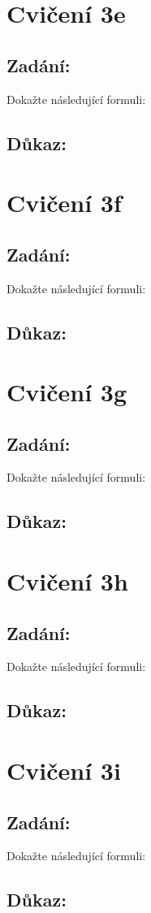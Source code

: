 \documentclass{article}
\begin{document}
\section{Cvičení 3e}

\subsection{Zadání:}

Dokažte následující formuli:
$$$$

\subsection{Důkaz:}

\section{Cvičení 3f}

\subsection{Zadání:}

Dokažte následující formuli:
$$$$

\subsection{Důkaz:}

\section{Cvičení 3g}

\subsection{Zadání:}

Dokažte následující formuli:
$$$$

\subsection{Důkaz:}

\section{Cvičení 3h}

\subsection{Zadání:}

Dokažte následující formuli:
$$$$

\subsection{Důkaz:}

\section{Cvičení 3i}

\subsection{Zadání:}

Dokažte následující formuli:
$$$$

\subsection{Důkaz:}
\end{document}
